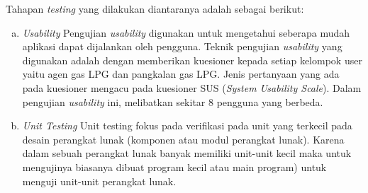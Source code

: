 \begin{enumerate}[1.]
	Tahapan \textit{testing} yang dilakukan diantaranya adalah sebagai berikut:
	\begin{enumerate}[a.]
			\itemsep0em
			\item \textit{Usability}
			\newline Pengujian \textit{usability} digunakan untuk mengetahui seberapa mudah aplikasi dapat dijalankan oleh pengguna. Teknik pengujian \textit{usability} yang digunakan adalah dengan memberikan kuesioner kepada setiap kelompok user yaitu agen gas LPG dan pangkalan gas LPG. Jenis pertanyaan yang ada pada kuesioner mengacu pada kuesioner SUS (\textit{System Usability Scale}). Dalam pengujian \textit{usability} ini, melibatkan sekitar 8 pengguna yang berbeda.
			\item \textit{Unit Testing}
			\newline Unit testing fokus pada verifikasi pada unit yang terkecil pada desain perangkat lunak (komponen atau modul perangkat lunak). Karena dalam sebuah perangkat lunak banyak memiliki unit-unit kecil maka untuk mengujinya biasanya dibuat program kecil atau main program) untuk menguji unit-unit perangkat lunak.
		
	\end{enumerate}
	
	
\end{enumerate}

